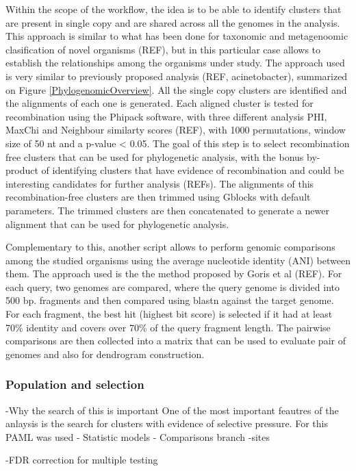 Within the scope of the workflow, the idea is to be able to identify clusters that are present in single copy and are shared across all the genomes in the analysis. This approach is similar to what has been done for taxonomic and metagenoomic clasification of novel organisms (REF), but in this particular case allows to establish the relationships among the organisms under study. The approach used is very similar to previously proposed analysis (REF, acinetobacter), summarized on Figure \ref{PhylogenomicOverview}. All the single copy clusters are identified and the alignments of each one is generated. Each aligned cluster is tested for recombination using the Phipack software, with three different analysis PHI, MaxChi and Neighbour similarty scores (REF), with 1000 permutations, window size of 50 nt and a p-value < 0.05. The goal of this step is to select recombination free clusters that can be used for phylogenetic analysis, with the bonus by-product of identifying clusters that have evidence of recombination and could be interesting candidates for further analysis (REFs). The alignments of this recombination-free clusters are then trimmed using Gblocks with default parameters. The trimmed clusters are then concatenated to generate a newer alignment that can be used for phylogenetic analysis.

Complementary to this, another script allows to perform genomic comparisons among the studied organisms using the average nucleotide identity (ANI) between them. The approach used is the the method proposed by Goris et al (REF). For each query, two genomes are compared, where the query genome is divided into 500 bp. fragments and then compared using blastn against the target genome. For each fragment, the best hit (highest bit score) is selected if it had at least 70\% identity and covers over 70\% of the query fragment length. The pairwise comparisons are then collected into a matrix that can be used to evaluate pair of genomes and also for dendrogram construction.

\subsubsection{Population and selection}

-Why the search of this is important 
One of the most important feautres of the anlaysis is the search for clusters with evidence of selective pressure. For this PAML was used
- Statistic models
- Comparisons branch -sites

-FDR correction for multiple testing


